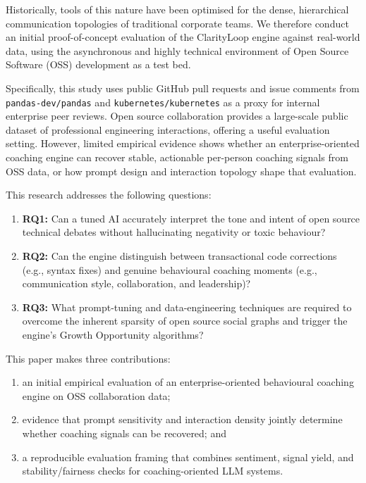 \documentclass[a4paper,UKenglish,cleveref,autoref]{lipics-v2021}
\begin{document}
Historically, tools of this nature have been optimised for the dense, hierarchical communication topologies of traditional corporate teams. We therefore conduct an initial proof-of-concept evaluation of the ClarityLoop engine against real-world data, using the asynchronous and highly technical environment of Open Source Software (OSS) development as a test bed.

Specifically, this study uses public GitHub pull requests and issue comments from \texttt{pandas-dev/pandas} and \texttt{kubernetes/kubernetes} as a proxy for internal enterprise peer reviews. Open source collaboration provides a large-scale public dataset of professional engineering interactions, offering a useful evaluation setting. However, limited empirical evidence shows whether an enterprise-oriented coaching engine can recover stable, actionable per-person coaching signals from OSS data, or how prompt design and interaction topology shape that evaluation.

This research addresses the following questions:
\begin{enumerate}
	\item \textbf{RQ1:} Can a tuned AI accurately interpret the tone and intent of open source technical debates without hallucinating negativity or toxic behaviour?
	\item \textbf{RQ2:} Can the engine distinguish between transactional code corrections (e.g., syntax fixes) and genuine behavioural coaching moments (e.g., communication style, collaboration, and leadership)?
	\item \textbf{RQ3:} What prompt-tuning and data-engineering techniques are required to overcome the inherent sparsity of open source social graphs and trigger the engine's Growth Opportunity algorithms?
\end{enumerate}

This paper makes three contributions:
\begin{enumerate}
	\item an initial empirical evaluation of an enterprise-oriented behavioural coaching engine on OSS collaboration data;
	\item evidence that prompt sensitivity and interaction density jointly determine whether coaching signals can be recovered; and
	\item a reproducible evaluation framing that combines sentiment, signal yield, and stability/fairness checks for coaching-oriented LLM systems.
\end{enumerate}
\end{document}
